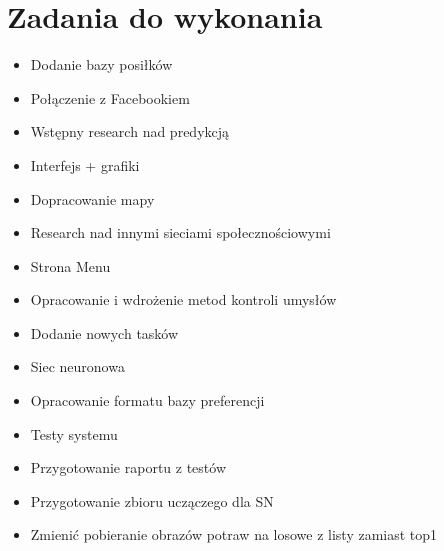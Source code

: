 \documentclass[a4paper,twoside,11pt]{article}
\begin{document}
\section{Zadania do wykonania}
\begin{itemize}
  \item Dodanie bazy posiłków
  \item Połączenie z Facebookiem
  \item Wstępny research nad predykcją
  \item Interfejs + grafiki
  \item Dopracowanie mapy
  \item Research nad innymi sieciami społecznościowymi
  \item Strona Menu
  \item Opracowanie i wdrożenie metod kontroli umysłów
  \item Dodanie nowych tasków
  \item Siec neuronowa
  \item Opracowanie formatu bazy preferencji
  \item Testy systemu
  \item Przygotowanie raportu z testów
  \item Przygotowanie zbioru uczączego dla SN
  \item Zmienić pobieranie obrazów potraw na losowe z listy zamiast top1
\end{itemize}
\end{document}

